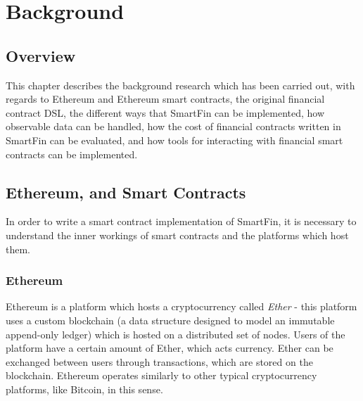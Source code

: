 \chapter{Background}

\section{Overview}

This chapter describes the background research which has been carried out, with regards to Ethereum and Ethereum smart contracts, the original financial contract DSL, the different ways that SmartFin can be implemented, how observable data can be handled, how the cost of financial contracts written in SmartFin can be evaluated, and how tools for interacting with financial smart contracts can be implemented.


\section{Ethereum, and Smart Contracts}

In order to write a smart contract implementation of SmartFin, it is necessary to understand the inner workings of smart contracts and the platforms which host them.

\subsection{Ethereum}

Ethereum is a platform which hosts a cryptocurrency called \textit{Ether} - this platform uses a custom blockchain (a data structure designed to model an immutable append-only ledger) which is hosted on a distributed set of nodes. Users of the platform have a certain amount of Ether, which acts currency. Ether can be exchanged between users through transactions, which are stored on the blockchain. Ethereum operates similarly to other typical cryptocurrency platforms, like Bitcoin, in this sense\cite{Bitc}. \\

